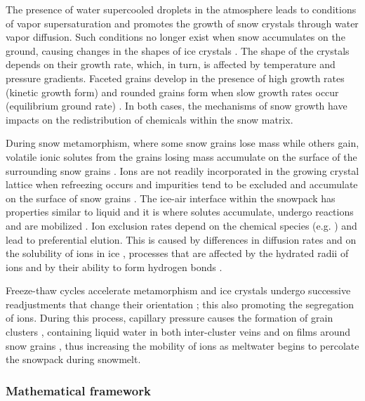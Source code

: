 \documentclass[authoryear,preprint,review,12pt]{elsarticle}
\begin{document}
The presence of water supercooled droplets in the atmosphere leads to conditions of vapor supersaturation and promotes the growth of snow crystals through water vapor diffusion. Such conditions no longer exist when snow accumulates on the ground, causing changes in the shapes of ice crystals \citep{Harrington1998}. The shape of the crystals depends on their growth rate, which, in turn, is affected by temperature and pressure gradients. Faceted grains develop in the presence of high growth rates (kinetic growth form) and rounded grains form when slow growth rates occur (equilibrium ground rate) \citep{Colbeck1986}. In both cases, the mechanisms of snow growth have impacts on the redistribution of chemicals within the snow matrix. \par

During snow metamorphism, where some snow grains lose mass while others gain, volatile ionic solutes from the grains losing mass accumulate on the surface of the surrounding snow grains \citep{Harrington1998}. Ions are not readily incorporated in the growing crystal lattice when refreezing occurs and impurities tend to be excluded and accumulate on the surface of snow grains \citep{Hewitt1991}. The ice-air interface within the snowpack has properties similar to liquid \citep{Fletcher1968} and it is where solutes accumulate, undergo reactions and are mobilized \citep{Chatterjee1971,Brimblecombe1991}. Ion exclusion rates depend on the chemical species (e.g. \citet{Davis1991,Pomeroy2005}) and lead to preferential elution. This is caused by differences in diffusion rates and on the solubility of ions in ice \citep{Harrington1998}, processes that are affected by the hydrated radii of ions and by their ability to form hydrogen bonds \citep{Lilbaek2008}. 

Freeze-thaw cycles accelerate metamorphism and ice crystals undergo successive readjustments that change their orientation \citep{Harrington1998}; this also promoting the segregation of ions. During this process, capillary pressure causes the formation of grain clusters \citep{Colbeck1979}, containing liquid water in both inter-cluster veins and on films around snow grains \citep{Harrington1998}, thus increasing the mobility of ions as meltwater begins to percolate the snowpack during snowmelt. \par


\subsubsection{Mathematical framework}
\label{chapter:nutrientmodeldevelopment}
\end{document}
